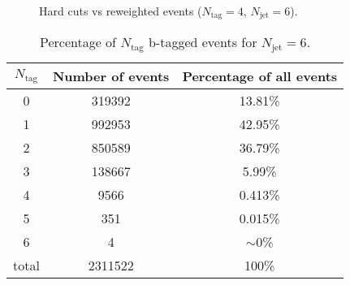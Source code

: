 \documentclass[12pt,a4paper]{article}
\makeatletter
\newcommand{\mcell}[2][c]{
	\begin{tabular}[#1]{@{}c@{}}#2\end{tabular}
}
\makeatother
\begin{document}
\begin{figure}[H]

\caption{Hard cuts vs reweighted events ($N_{\text{tag}}=4,\,N_{\text{jet}}=6$).}
\label{fig:jet_vars}
\end{figure}
\begin{table}[H]
	\begin{center}
		\begin{tabular}{ c | c | c }
			\hline
			$N_{\text{tag}}$ & Number of events & Percentage of all events \\ \hline
			0 & 319392 & 13.81\% \\
			1 & 992953 & 42.95\% \\
			2 & 850589 & 36.79\% \\
			3 & 138667 & 5.99\% \\
			4 & 9566 & 0.413\% \\
			5 & 351 & 0.015\% \\
			6 & 4 & $\sim$0\% \\ \hline
			total & 2311522 & 100\%
		\end{tabular}
	\end{center}
	\caption{Percentage of $N_{\text{tag}}$ b-tagged events for $N_{\text{jet}}=6$.}
	\label{tab:percentage}
\end{table}

\end{document}
